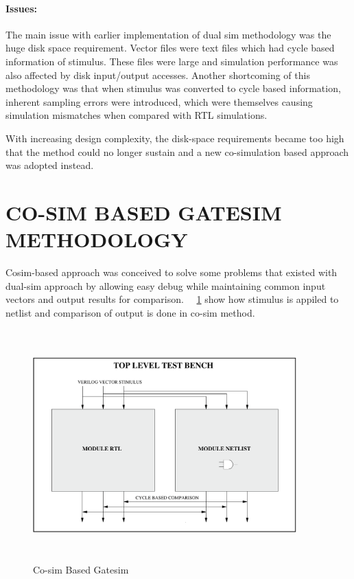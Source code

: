 \paragraph{Issues:}The main issue with earlier implementation of dual sim methodology was the huge disk space requirement. Vector files were text files which had cycle based information of stimulus. These files were large and simulation performance was also affected by disk input/output accesses. Another shortcoming of this methodology was that when stimulus was converted to cycle based information, inherent sampling errors were introduced, which were themselves causing simulation mismatches when compared with RTL simulations.

 
 With increasing design complexity, the disk-space requirements became too high that the method could no longer sustain and a new co-simulation based approach was adopted instead.





\section{CO-SIM BASED GATESIM METHODOLOGY}
 Cosim-based approach was conceived to solve some problems that existed with dual-sim approach by allowing easy debug while maintaining common input vectors and output results for comparison.  ~\figurename{~\ref{fig:cosim.ps}} show how stimulus is appiled to netlist and comparison of output is done in co-sim method.
 
\begin{figure}[h!]
\centering
\includegraphics[width=4in, height=3.5in]{./figures/cosim.ps}
\caption{Co-sim Based Gatesim}
\label{fig:cosim.ps}
\end{figure}


